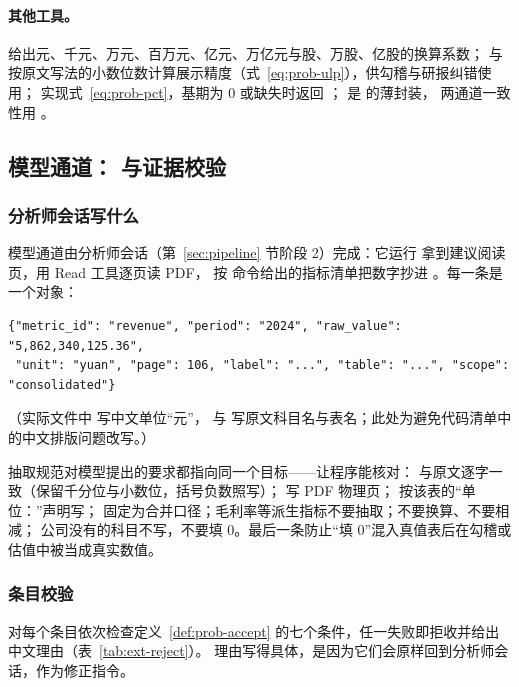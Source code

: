 \paragraph{其他工具。}
 给出元、千元、万元、百万元、亿元、万亿元与股、万股、亿股的换算系数；
 与  按原文写法的小数位数计算展示精度（式~\ref{eq:prob-ulp}），供勾稽与研报纠错使用；
 实现式~\ref{eq:prob-pct}，基期为 0 或缺失时返回 ； 是  的薄封装，
两通道一致性用 。

\subsection{模型通道： 与证据校验}
\label{sec:ext-llm}

\subsubsection{分析师会话写什么}

模型通道由分析师会话（第~\ref{sec:pipeline} 节阶段 2）完成：它运行  拿到建议阅读页，用 Read 工具逐页读 PDF，
按  命令给出的指标清单把数字抄进 。每一条是一个对象：

\begin{lstlisting}
{"metric_id": "revenue", "period": "2024", "raw_value": "5,862,340,125.36",
 "unit": "yuan", "page": 106, "label": "...", "table": "...", "scope": "consolidated"}
\end{lstlisting}
（实际文件中  写中文单位“元”， 与  写原文科目名与表名；此处为避免代码清单中的中文排版问题改写。）

抽取规范对模型提出的要求都指向同一个目标——让程序能核对： 与原文逐字一致（保留千分位与小数位，括号负数照写）；
 写 PDF 物理页； 按该表的“单位：”声明写； 固定为合并口径；毛利率等派生指标不要抽取；不要换算、不要相减；
公司没有的科目不写，不要填 0。最后一条防止“填 0”混入真值表后在勾稽或估值中被当成真实数值。

\subsubsection{条目校验 }

 对每个条目依次检查定义~\ref{def:prob-accept} 的七个条件，任一失败即拒收并给出中文理由（表~\ref{tab:ext-reject}）。
理由写得具体，是因为它们会原样回到分析师会话，作为修正指令。

